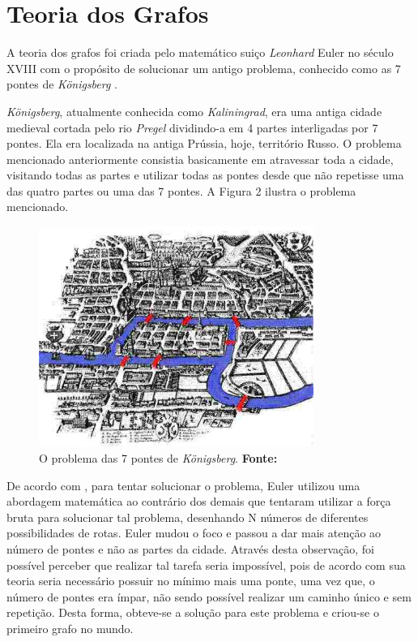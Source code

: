 \section{Teoria dos Grafos}

\par A teoria dos grafos foi criada pelo matemático suiço \textit{Leonhard} Euler no século XVIII com o propósito de solucionar um antigo problema, conhecido como as 7 pontes de \textit{Königsberg} \cite{harju_graph_theory}.

\par \textit{Königsberg}, atualmente conhecida como \textit{Kaliningrad}, era uma antiga cidade medieval cortada pelo rio \textit{Pregel} dividindo-a em 4 partes interligadas por 7 pontes. Ela era localizada na antiga Prússia, hoje, território Russo. O problema mencionado anteriormente consistia basicamente em atravessar toda a cidade, visitando todas as partes e utilizar todas as pontes desde que não repetisse uma das quatro partes ou uma das 7 pontes. A Figura 2 ilustra o problema mencionado.

\begin{figure}[h!]
	\centerline{\includegraphics[height=0.26\textheight,width=0.8\textwidth]{./imagens/Konigsberg_7_bridges.jpg}}
	\caption[O problema das 7 pontes de \textit{Königsberg} ]
	{O problema das 7 pontes de \textit{Königsberg}. \textbf{Fonte:} }
	\label{fig:exemplo1}
\end{figure}

\par De acordo com , para tentar solucionar o problema, Euler utilizou uma abordagem matemática ao contrário dos demais que tentaram utilizar a força bruta para solucionar tal problema, desenhando N números de diferentes possibilidades de rotas. Euler mudou o foco e passou a dar mais atenção ao número de pontes e não as partes da cidade. Através desta observação, foi possível perceber que realizar tal tarefa seria impossível, pois de acordo com sua teoria seria necessário possuir no mínimo mais uma ponte, uma vez que, o número de pontes era ímpar, não sendo possível realizar um caminho único e sem repetição. Desta forma, obteve-se a solução para este problema e criou-se o primeiro grafo no mundo.

